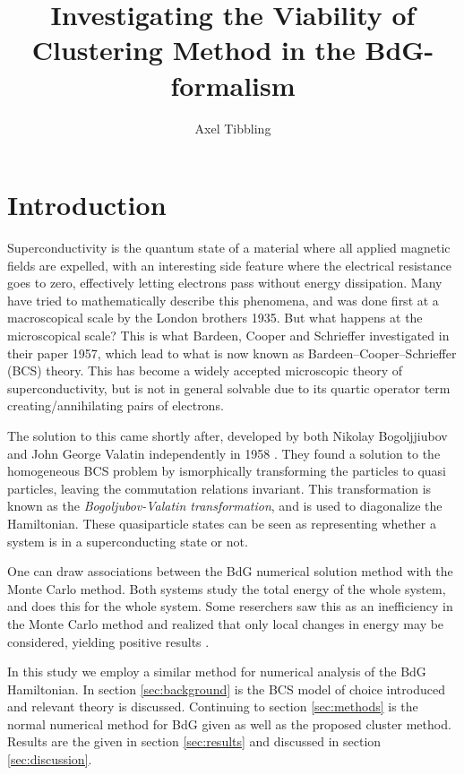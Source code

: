 \documentclass[11pt]{article}
\title{Investigating the Viability of Clustering Method in the BdG-formalism}
\author{Axel Tibbling}
\date{ }
\begin{document}
\maketitle

\section{Introduction}\label{sec:introduction}

Superconductivity is the quantum state of a material where all applied magnetic fields are expelled, with an interesting side feature where the electrical resistance goes to zero, effectively letting electrons pass without energy dissipation. Many have tried to mathematically describe this phenomena, and was done first at a macroscopical scale by the London brothers \cite{londonElectromagneticEquationsSupraconductor} 1935. But what happens at the microscopical scale? This is what Bardeen, Cooper and Schrieffer investigated in their paper \cite{bardeenTheorySuperconductivity1957} 1957, which lead to what is now known as Bardeen–Cooper–Schrieffer (BCS) theory. This has become a widely accepted microscopic theory of superconductivity, but is not in general solvable due to its quartic operator term creating/annihilating pairs of electrons. 

The solution to this came shortly after, developed by both Nikolay Bogoljjiubov and John George Valatin independently in 1958 \cite{valatinCommentsTheorySuperconductivity1958a,bogoljubovNewMethodTheory1958} . They found a solution to the homogeneous BCS problem by ismorphically transforming the particles to quasi particles, leaving the commutation relations invariant. This transformation is known as the \textit{Bogoljubov-Valatin transformation}, and is used to diagonalize the Hamiltonian. These quasiparticle states can be seen as representing whether a system is in a superconducting state or not.  

One can draw associations between the BdG numerical solution method with the Monte Carlo method. Both systems study the total energy of the whole system, and does this for the whole system. Some reserchers saw this as an inefficiency in the Monte Carlo method and realized that only local changes in energy may be considered, yielding positive results \cite{karmakarDisorderStabilizedBreachedpair2022, kumarTravellingClusterApproximation2006}.

In this study we employ a similar method for numerical analysis of the BdG Hamiltonian. In section \ref{sec:background} is the BCS model of choice introduced and relevant theory is discussed. Continuing to section \ref{sec:methods} is the normal numerical method for BdG given as well as the proposed cluster method. Results are the given in section \ref{sec:results} and discussed in section \ref{sec:discussion}.  
\end{document}
